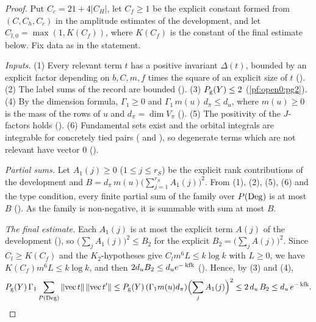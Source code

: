\begin{proof}
Put $C_c=21+4|C_H|$, let $C_f\ge1$ be the explicit constant formed from $(C,C_h,C_c)$ in the amplitude estimates of the development, and
let $C_{l,0}=\max(1,K(C_f))$, where $K(C_f)$ is the constant of the final estimate below. Fix data as in the statement.

\emph{Inputs.} (1) Every relevant term $t$ has a positive invariant $\Delta(t)$, bounded by an explicit factor depending on $b,C,m,f$ times the square of an explicit size of $t$ (). (2) The label sums of the record are
bounded (). (3) $P_{\mathrm g}(Y)\le2$ (\cref{pf:open0:pg2}). (4) By the dimension
formula, $\Gamma_1\ge0$ and $\Gamma_1\,m(u)\,d_\pi\le d_u$, where $m(u)\ge0$ is the mass of the rows of $u$ and $d_\pi=\dim V_\pi$
(). (5) The positivity of the $J$-factors holds ().
(6) Fundamental sets exist and the orbital integrals are integrable for concretely tied pairs
( and ), so degenerate terms which are not
relevant have vector $0$ ().

\emph{Partial sums.} Let $A_1(j)\ge0$ ($1\le j\le r_S$) be the explicit rank contributions of the development and
$B=d_\pi\,m(u)\bigl(\sum_{j=1}^{r_S}A_1(j)\bigr)^2$. From (1), (2), (5), (6) and the type condition, every finite partial sum of the family
over $P(\mathrm{Deg})$ is at most $B$ (). As the family is non-negative, it is summable
with sum at most $B$.

\emph{The final estimate.} Each $A_1(j)$ is at most the explicit term $A(j)$ of the development
(), so $\bigl(\sum_jA_1(j)\bigr)^2\le B_2$ for the explicit
$B_2=\bigl(\sum_jA(j)\bigr)^2$. Since $C_l\ge K(C_f)$ and the $K_2$-hypotheses give $C_lm^6L\le k\log k$ with $L\ge0$, we have
$K(C_f)m^6L\le k\log k$, and then $2d_uB_2\le d_ue^{-\operatorname{kfk}}$ ().
Hence, by (3) and (4),
\[
P_{\mathrm g}(Y)\,\Gamma_1\sum_{P(\mathrm{Deg})}\|\mathrm{vec}\,t\|\,\|\mathrm{vec}\,t'\|\le P_{\mathrm g}(Y)\,(\Gamma_1m(u)d_\pi)\Bigl(\sum_jA_1(j)\Bigr)^2
\le2\,d_u\,B_2\le d_u\,e^{-\operatorname{kfk}}.
\qedhere
\]
\end{proof}

